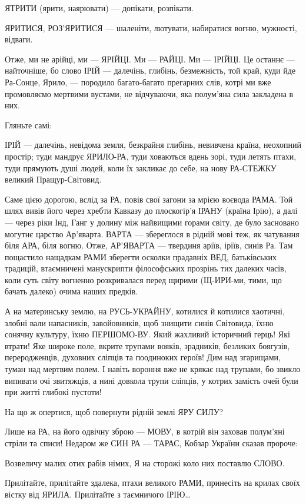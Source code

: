 ЯТРИТИ (ярити, наярювати) — допікати, розпікати.

ЯРИТИСЯ, РОЗ’ЯРИТИСЯ — шаленіти, лютувати, набиратися вогню, мужності, відваги.

Отже, ми не арійці, ми — ЯРІЙЦІ. Ми — РАЙЦІ. Ми — ІРІЙЦІ. Це останнє —
найточніше, бо слово ІРІЙ — далечінь, глибінь, безмежність, той край, куди йде
Ра-Сонце, Ярило, — породило багато-багато прегарних слів, котрі ми вже
промовляємо мертвими вустами, не відчуваючи, яка полум’яна сила закладена в
них.

Гляньте самі:

ІРІЙ — далечінь, невідома земля, безкрайня глибінь, невивчена країна, неохопний
простір; туди мандрує ЯРИЛО-РА, туди ховаються вдень зорі, туди летять птахи,
туди прямують душі людей, коли їх закликає до себе, на нову РА-СТЕЖКУ великий
Пращур-Світовид.

Саме цією дорогою, вслід за РА, повів свої загони за мрією воєвода РАМА. Той
шлях вивів його через хребти Кавказу до плоскогір’я ІРАНУ (країна Ірію), а далі
— через ріки Інд, Ганг у долину між найвищими горами світу, де було засновано
могутнє царство Ар’яварта. ВАРТА — збереглося в рідній мові теж, як чатування
біля АРА, біля вогню. Отже, АР’ЯВАРТА — твердиня аріїв, іріїв, синів Ра. Там
пощастило нащадкам РАМИ зберегти осколки прадавніх ВЕД, батьківських традицій,
втаємничені манускрипти філософських прозрінь тих далеких часів, коли суть
світу вогненно розкривалася перед щирими (Щ-ИРИ-ми, тими, що бачать далеко)
очима наших предків.

А на материнську землю, на РУСЬ-УКРАЙНУ, котилися й котилися хаотичні, злобні
вали напасників, завойовників, щоб знищити синів Світовида, їхню сонячну
культуру, їхню ПЕРШОМО-ВУ. Який жахливий історичний герць! Які втрати! Яке
широке поле, вкрите трупами вояків, зрадників, безликих боягузів,
переродженців, духовних сліпців та поодиноких героїв! Дим над згарищами, туман
над мертвим полем. І навіть вороння вже не крякає над трупами, бо звикло
випивати очі звитяжців, а нині довкола трупи сліпців, у котрих замість очей
були при житті глибокі пустоти!

На що ж опертися, щоб повернути рідній землі ЯРУ СИЛУ?

Лише на РА, на його одвічну зброю — МОВУ, в котрій він заховав полум’яні стріли
та списи! Недаром же СИН РА — ТАРАС, Кобзар України сказав пророче:

\obeycr
Возвеличу
малих отих рабів німих,
Я на сторожі коло них
поставлю СЛОВО.
\restorecr

Прилітайте, прилітайте здалека, птахи великого РАМИ, принесіть на крилах своїх вістку від ЯРИЛА. Прилітайте з таємничого ІРІЮ…

